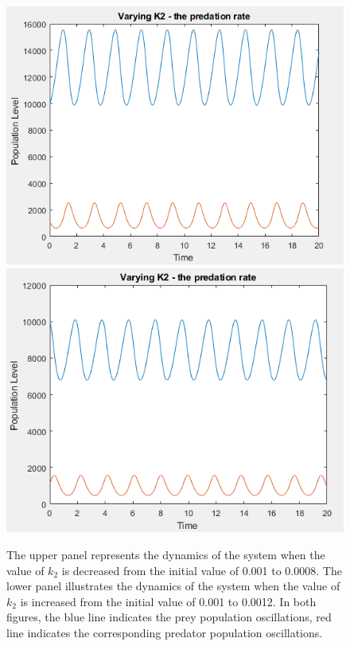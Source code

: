 \documentclass{article}
\begin{document}
\begin{figure}[H]
    \includegraphics[scale = 0.7]{k2_low.PNG}
    \includegraphics[scale = 0.725]{k2_high.PNG}
    \caption{The upper panel represents the dynamics of the system when the value of $k_2$ is decreased from the initial value of 0.001 to 0.0008. The lower panel illustrates the dynamics of the system when the value of $k_2$ is increased from the initial value of 0.001 to 0.0012. In both figures, the blue line indicates the prey population oscillations, red line indicates the corresponding predator population oscillations.}
    \label{fig:k2_vals}
\end{figure}
\end{document}
